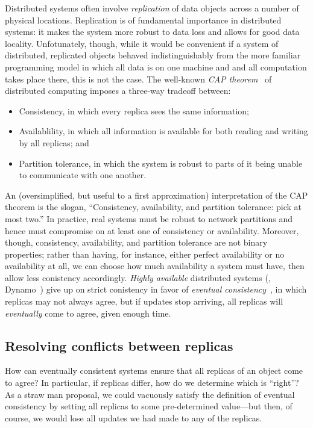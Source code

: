 \documentclass{article}
\begin{document}
Distributed systems often involve \emph{replication} of data objects
across a number of physical locations.  Replication is of fundamental
importance in distributed systems: it makes the system more robust to
data loss and allows for good data locality.  Unfotunately, though,
while it would be convenient if a system of distributed, replicated
objects behaved indistinguishably from the more familiar programming
model in which all data is on one machine and and all computation
takes place there, this is not the case.  The well-known \emph{CAP
  theorem}~\cite{gilbert-lynch-cap} of distributed computing imposes a
three-way tradeoff between:
\begin{itemize}
\item Consistency, in which every replica sees the same information;
\item Availablility, in which all information is available for both
  reading and writing by all replicas; and
\item Partition tolerance, in which the system is robust to parts of
  it being unable to communicate with one another.
\end{itemize}
An (oversimplified, but useful to a first approximation)
interpretation of the CAP theorem is the slogan, ``Consistency,
availability, and partition tolerance: pick at most two.''  In
practice, real systems must be robust to network partitions and hence
must compromise on at least one of consistency or availability.
Moreover, though, consistency, availability, and partition tolerance
are not binary properties; rather than having, for instance, either
perfect availability or no availability at all, we can choose how much
availability a system must have, then allow less conistency
accordingly.  \emph{Highly available} distributed systems (\eg,
Dynamo~\cite{dynamo}) give up on strict conistency in favor of
\emph{eventual consistency}~\cite{vogels-ec}, in which replicas may
not always agree, but if updates stop arriving, all replicas will
\emph{eventually} come to agree, given enough time.

\subsection{Resolving conflicts between replicas}

How can eventually consistent systems ensure that all replicas of an
object come to agree?  In particular, if replicas differ, how do we
determine which is ``right''?  As a straw man proposal, we could
vacuously satisfy the definition of eventual consistency by setting
all replicas to some pre-determined value---but then, of course, we
would lose all updates we had made to any of the replicas.
\end{document}
